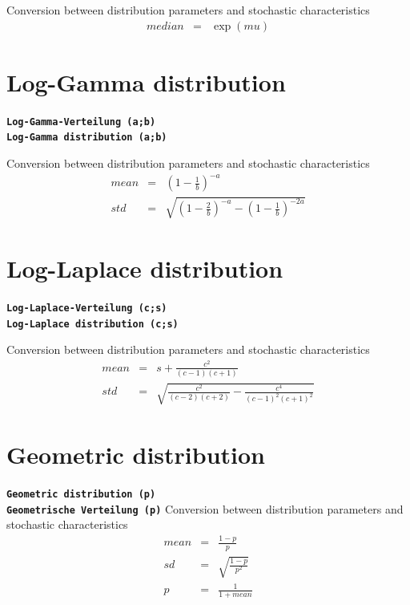 \documentclass{svmono}
\def\cm#1{\textbf{\texttt{#1}}}
\begin{document}
Conversion between distribution parameters and stochastic characteristics
\begin{eqnarray*}
median&=&\exp(mu)
\end{eqnarray*}



\section*{Log-Gamma distribution}
\cm{Log-Gamma-Verteilung (a;b)}~\\
\cm{Log-Gamma distribution (a;b)}

Conversion between distribution parameters and stochastic characteristics
\begin{eqnarray*}
mean&=&\left(1-\frac{1}{b}\right)^{-a}\\
std&=&\sqrt{\left(1-\frac{2}{b}\right)^{-a}-\left(1-\frac{1}{b}\right)^{-2a}}
\end{eqnarray*}





\section*{Log-Laplace distribution}
\cm{Log-Laplace-Verteilung (c;s)}~\\
\cm{Log-Laplace distribution (c;s)}

Conversion between distribution parameters and stochastic characteristics
\begin{eqnarray*}
mean&=&s+\frac{c^2}{(c-1)(c+1)}\\
std&=&\sqrt{\frac{c^2}{(c-2)(c+2)}-\frac{c^4}{(c-1)^2(c+1)^2}}
\end{eqnarray*}





\section*{Geometric distribution}
\cm{Geometric distribution (p)}~\\
\cm{Geometrische Verteilung (p)}
Conversion between distribution parameters and stochastic characteristics
\begin{eqnarray*}
mean&=&\frac{1-p}{p}\\
sd&=&\sqrt{\frac{1-p}{p^2}}\\
p&=&\frac{1}{1+mean}
\end{eqnarray*}
\end{document}
